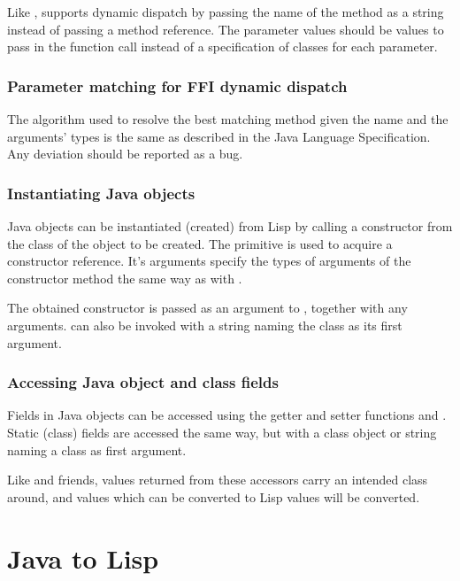 \documentclass[10pt]{book}
\begin{document}
Like ,  supports dynamic dispatch by
passing the name of the method as a string instead of passing a method reference.
The parameter values should be values to pass in the function call instead of
a specification of classes for each parameter.

\subsubsection{Parameter matching for FFI dynamic dispatch}
\label{sec:param-matching-for-ffi}

The algorithm used to resolve the best matching method given the name
and the arguments' types is the same as described in the Java Language
Specification. Any deviation should be reported as a bug.


\subsubsection{Instantiating Java objects}

Java objects can be instantiated (created) from Lisp by calling
a constructor from the class of the object to be created. The
 primitive is used to acquire a constructor
reference. It's arguments specify the types of arguments of the constructor
method the same way as with .

The obtained constructor is passed as an argument to ,
together with any arguments.   can also be invoked with
a string naming the class as its first argument.

\subsubsection{Accessing Java object and class fields}

Fields in Java objects can be accessed using the getter and setter
functions  and .  Static
(class) fields are accessed the same way, but with a class object or
string naming a class as first argument.

Like  and friends, values returned from these accessors carry
an intended class around, and values which can be converted to Lisp values will
be converted.

\section{Java to Lisp}
\end{document}
